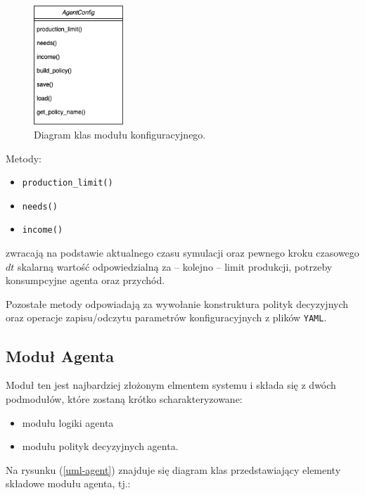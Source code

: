\documentclass{article}
\begin{document}
\begin{figure}[H]
	\centering
	\includegraphics[width=0.3\textwidth, height=0.3\textheight]{./config-uml.png}
	\caption{Diagram klas modułu konfiguracyjnego.}
	\label{uml-config}
\end{figure}

Metody:
\begin{itemize}
	\item \texttt{production\_limit()}
	\item \texttt{needs()}
	\item \texttt{income()}
\end{itemize}

zwracają na podstawie aktualnego czasu symulacji oraz pewnego kroku czasowego $dt$ skalarną wartość odpowiedzialną za -- kolejno -- limit produkcji, potrzeby konsumpcyjne agenta
oraz przychód.

Pozostałe metody odpowiadają za wywołanie konstruktura polityk decyzyjnych oraz operacje zapisu/odczytu parametrów konfiguracyjnych z plików \texttt{YAML}.


\subsection{Moduł Agenta}

Moduł ten jest najbardziej złożonym elmentem systemu i składa się z dwóch podmodułów, które zostaną krótko scharakteryzowane:

\begin{itemize}
	\item modułu logiki agenta
	\item modułu polityk decyzyjnych agenta.
\end{itemize}


Na rysunku (\ref{uml-agent}) znajduje się diagram klas przedstawiający elementy składowe modułu agenta, tj.:
\end{document}
